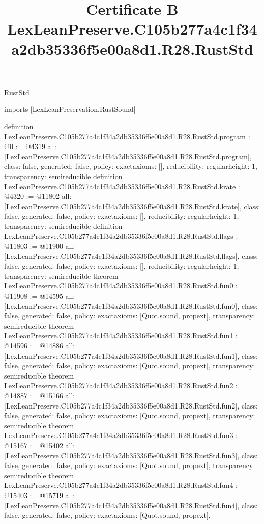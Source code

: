 \begin{lexlean}{RustStd}
\title{Certificate B LexLeanPreserve.C105b277a4c1f34a2db35336f5e00a8d1.R28.RustStd}
\begin{coremodule}
imports [LexLeanPreservation.RustSound]

definition LexLeanPreserve.C105b277a4c1f34a2db35336f5e00a8d1.R28.RustStd.program : @0 := @4319 {
  all: [LexLeanPreserve.C105b277a4c1f34a2db35336f5e00a8d1.R28.RustStd.program],
  class: false,
  generated: false,
  policy: exact{axioms: []},
  reducibility: regular{height: 1},
  transparency: semireducible
}
definition LexLeanPreserve.C105b277a4c1f34a2db35336f5e00a8d1.R28.RustStd.krate : @4320 := @11802 {
  all: [LexLeanPreserve.C105b277a4c1f34a2db35336f5e00a8d1.R28.RustStd.krate],
  class: false,
  generated: false,
  policy: exact{axioms: []},
  reducibility: regular{height: 1},
  transparency: semireducible
}
definition LexLeanPreserve.C105b277a4c1f34a2db35336f5e00a8d1.R28.RustStd.flags : @11803 := @11900 {
  all: [LexLeanPreserve.C105b277a4c1f34a2db35336f5e00a8d1.R28.RustStd.flags],
  class: false,
  generated: false,
  policy: exact{axioms: []},
  reducibility: regular{height: 1},
  transparency: semireducible
}
theorem LexLeanPreserve.C105b277a4c1f34a2db35336f5e00a8d1.R28.RustStd.fun0 : @11908 := @14595 {
  all: [LexLeanPreserve.C105b277a4c1f34a2db35336f5e00a8d1.R28.RustStd.fun0],
  class: false,
  generated: false,
  policy: exact{axioms: [Quot.sound, propext]},
  transparency: semireducible
}
theorem LexLeanPreserve.C105b277a4c1f34a2db35336f5e00a8d1.R28.RustStd.fun1 : @14596 := @14886 {
  all: [LexLeanPreserve.C105b277a4c1f34a2db35336f5e00a8d1.R28.RustStd.fun1],
  class: false,
  generated: false,
  policy: exact{axioms: [Quot.sound, propext]},
  transparency: semireducible
}
theorem LexLeanPreserve.C105b277a4c1f34a2db35336f5e00a8d1.R28.RustStd.fun2 : @14887 := @15166 {
  all: [LexLeanPreserve.C105b277a4c1f34a2db35336f5e00a8d1.R28.RustStd.fun2],
  class: false,
  generated: false,
  policy: exact{axioms: [Quot.sound, propext]},
  transparency: semireducible
}
theorem LexLeanPreserve.C105b277a4c1f34a2db35336f5e00a8d1.R28.RustStd.fun3 : @15167 := @15402 {
  all: [LexLeanPreserve.C105b277a4c1f34a2db35336f5e00a8d1.R28.RustStd.fun3],
  class: false,
  generated: false,
  policy: exact{axioms: [Quot.sound, propext]},
  transparency: semireducible
}
theorem LexLeanPreserve.C105b277a4c1f34a2db35336f5e00a8d1.R28.RustStd.fun4 : @15403 := @15719 {
  all: [LexLeanPreserve.C105b277a4c1f34a2db35336f5e00a8d1.R28.RustStd.fun4],
  class: false,
  generated: false,
  policy: exact{axioms: [Quot.sound, propext]},
}
\end{coremodule}
\end{lexlean}

